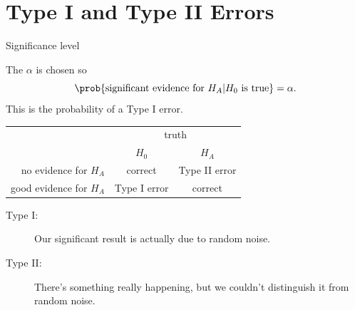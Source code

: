 \section{Type I and Type II Errors}


\begin{frame}{Significance level}

    The  $\alpha$ is chosen so
    \[
        \prob \{ \text{significant evidence for $H_A$} | \text{$H_0$ is true} \} = \alpha .
    \]
    This is the probability of a \alert{Type I error}.


    \vspace{2em}

    \begin{tabular}{r|cc}
        & \multicolumn{2}{c}{truth} \\
        & $H_0$ & $H_A$ \\
        \hline
        no evidence for $H_A$ & correct & Type II error \\
        good evidence for $H_A$ & Type I error & correct \\
    \end{tabular}

    \vspace{2em}

    \begin{description}
        \item[Type I:] Our significant result is actually due to random noise.
        \item[Type II:] There's something really happening, but we couldn't distinguish it from random noise.
    \end{description}

\end{frame}

